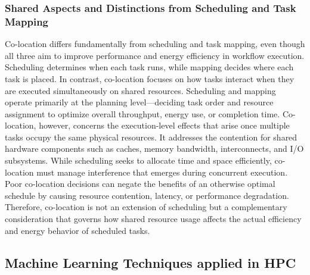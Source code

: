 \subsubsection{Shared Aspects and Distinctions from Scheduling and Task Mapping}
\label{sec:background_colocation_scheduling}
Co-location differs fundamentally from scheduling and task mapping, even though all three aim to improve performance and energy efficiency in workflow execution. Scheduling determines when each task runs, while mapping decides where each task is placed. In contrast, co-location focuses on how tasks interact when they are executed simultaneously on shared resources.
Scheduling and mapping operate primarily at the planning level—deciding task order and resource assignment to optimize overall throughput, energy use, or completion time. Co-location, however, concerns the execution-level effects that arise once multiple tasks occupy the same physical resources. It addresses the contention for shared hardware components such as caches, memory bandwidth, interconnects, and I/O subsystems.
While scheduling seeks to allocate time and space efficiently, co-location must manage interference that emerges during concurrent execution. Poor co-location decisions can negate the benefits of an otherwise optimal schedule by causing resource contention, latency, or performance degradation. Therefore, co-location is not an extension of scheduling but a complementary consideration that governs how shared resource usage affects the actual efficiency and energy behavior of scheduled tasks.

\subsection{Machine Learning Techniques applied in HPC}
\label{sec:background_ml}

